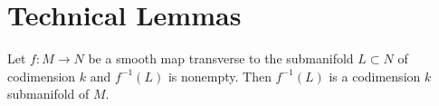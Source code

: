\chapter{Technical Lemmas}

\begin{lemma}\label{lem:transmap}
    Let $f:M\to N$ be a smooth map transverse to the submanifold $L\subset N$ of codimension $k$ and $f^{-1}(L)$ is nonempty.
    Then $f^{-1}(L)$ is a codimension $k$ submanifold of $M$.
\end{lemma}
